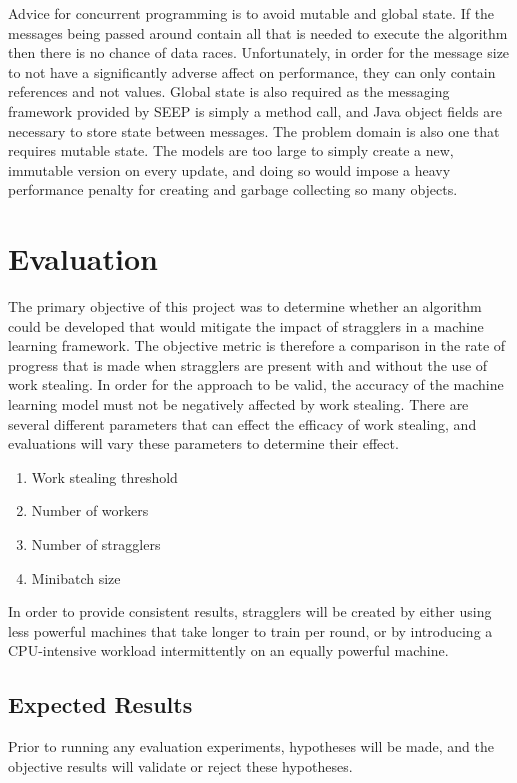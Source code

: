 \documentclass[12pt]{article}
\begin{document}
Advice for concurrent programming is to avoid mutable and global state. If the messages being passed around contain all that is needed to execute the algorithm then there is no chance of data races. Unfortunately, in order for the message size to not have a significantly adverse affect on performance, they can only contain references and not values. Global state is also required as the messaging framework provided by SEEP is simply a method call, and Java object fields are necessary to store state between messages. The problem domain is also one that requires mutable state. The models are too large to simply create a new, immutable version on every update, and doing so would impose a heavy performance penalty for creating and garbage collecting so many objects.

\newpage

\section{Evaluation}

The primary objective of this project was to determine whether an algorithm could be developed that would mitigate the impact of stragglers in a machine learning framework. The objective metric is therefore a comparison in the rate of progress that is made when stragglers are present with and without the use of work stealing. In order for the approach to be valid, the accuracy of the machine learning model must not be negatively affected by work stealing.
\newline
\newline
There are several different parameters that can effect the efficacy of work stealing, and evaluations will vary these parameters to determine their effect.

\begin{enumerate}
\item Work stealing threshold
\item Number of workers
\item Number of stragglers
\item Minibatch size
\end{enumerate}

In order to provide consistent results, stragglers will be created by either using less powerful machines that  take longer to train per round, or by introducing a CPU-intensive workload intermittently on an equally powerful machine.

\subsection{Expected Results}
Prior to running any evaluation experiments, hypotheses will be made, and the objective results will validate or reject these hypotheses.
\end{document}
